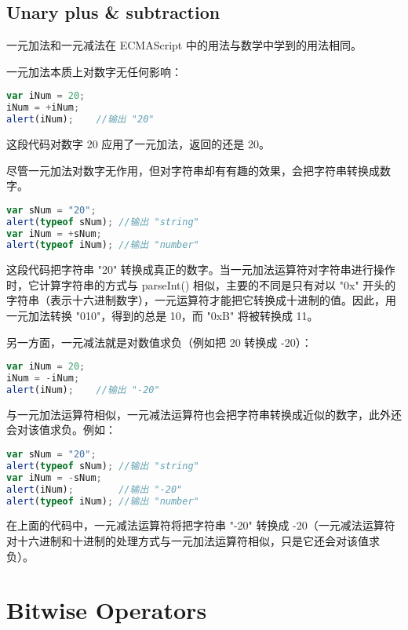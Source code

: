 \section{Unary plus \& subtraction}

一元加法和一元减法在 ECMAScript 中的用法与数学中学到的用法相同。

一元加法本质上对数字无任何影响：

\begin{lstlisting}[language=JavaScript]
var iNum = 20;
iNum = +iNum;
alert(iNum);	//输出 "20"
\end{lstlisting}

这段代码对数字 20 应用了一元加法，返回的还是 20。

尽管一元加法对数字无作用，但对字符串却有有趣的效果，会把字符串转换成数字。

\begin{lstlisting}[language=JavaScript]
var sNum = "20";
alert(typeof sNum);	//输出 "string"
var iNum = +sNum;
alert(typeof iNum);	//输出 "number"
\end{lstlisting}


这段代码把字符串 "20" 转换成真正的数字。当一元加法运算符对字符串进行操作时，它计算字符串的方式与 parseInt() 相似，主要的不同是只有对以 "0x" 开头的字符串（表示十六进制数字），一元运算符才能把它转换成十进制的值。因此，用一元加法转换 "010"，得到的总是 10，而 "0xB" 将被转换成 11。

另一方面，一元减法就是对数值求负（例如把 20 转换成 -20）：


\begin{lstlisting}[language=JavaScript]
var iNum = 20;
iNum = -iNum;
alert(iNum);	//输出 "-20"
\end{lstlisting}

与一元加法运算符相似，一元减法运算符也会把字符串转换成近似的数字，此外还会对该值求负。例如：


\begin{lstlisting}[language=JavaScript]
var sNum = "20";
alert(typeof sNum);	//输出 "string"
var iNum = -sNum;
alert(iNum);		//输出 "-20"
alert(typeof iNum);	//输出 "number"
\end{lstlisting}


在上面的代码中，一元减法运算符将把字符串 "-20" 转换成 -20（一元减法运算符对十六进制和十进制的处理方式与一元加法运算符相似，只是它还会对该值求负）。


\chapter{Bitwise Operators}


